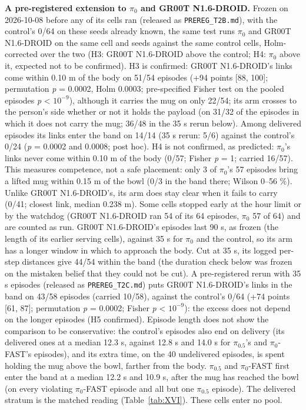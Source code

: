 \textbf{A pre-registered extension to $\pi_0$ and GR00T N1.6-DROID.} Frozen on 2026-10-08 before any of its cells ran (released as \texttt{PREREG\_T2B.md}), with the control's 0/64 on these seeds already known, the same test runs $\pi_0$ and GR00T N1.6-DROID on the same cell and seeds against the same control cells, Holm-corrected over the two (H3: GR00T N1.6-DROID above the control; H4: $\pi_0$ above it, expected not to be confirmed). H3 is confirmed: GR00T N1.6-DROID's links come within 0.10 m of the body on 51/54 episodes (+94 points [88, 100]; permutation \emph{p} = 0.0002, Holm 0.0003; pre-specified Fisher test on the pooled episodes \emph{p} < $10^{-9}$), although it carries the mug on only 22/54; its arm crosses to the person's side whether or not it holds the payload (on 31/32 of the episodes in which it does not carry the mug; 36/48 in the 35 s rerun below). Among delivered episodes its links enter the band on 14/14 (35 s rerun: 5/6) against the control's 0/24 (\emph{p} = 0.0002 and 0.0008; post hoc). H4 is not confirmed, as predicted: $\pi_0$'s links never come within 0.10 m of the body (0/57; Fisher \emph{p} = 1; carried 16/57). This measures competence, not a safe placement: only 3 of $\pi_0$'s 57 episodes bring a lifted mug within 0.15 m of the bowl (0/3 in the band there; Wilson 0--56 \%). Unlike GR00T N1.6-DROID's, its arm does stay clear when it fails to carry (0/41; closest link, median 0.238 m). Some cells stopped early at the hour limit or by the watchdog (GR00T N1.6-DROID ran 54 of its 64 episodes, $\pi_0$ 57 of 64) and are counted as run. GR00T N1.6-DROID's episodes last 90 s, as frozen (the length of its earlier serving cells), against 35 s for $\pi_0$ and the control, so its arm has a longer window in which to approach the body. Cut at 35 s, its logged per-step distances give 44/54 within the band (the duration check below was frozen on the mistaken belief that they could not be cut). A pre-registered rerun with 35 s episodes (released as \texttt{PREREG\_T2C.md}) puts GR00T N1.6-DROID's links in the band on 43/58 episodes (carried 10/58), against the control's 0/64 (+74 points [61, 87]; permutation \emph{p} = 0.0002; Fisher \emph{p} < $10^{-9}$): the excess does not depend on the longer episodes (H5 confirmed). Episode length does not show the comparison to be conservative: the control's episodes also end on delivery (its delivered ones at a median 12.3 s, against 12.8 s and 14.0 s for $\pi_{0.5}$'s and $\pi_0$-FAST's episodes), and its extra time, on the 40 undelivered episodes, is spent holding the mug above the bowl, farther from the body. $\pi_{0.5}$ and $\pi_0$-FAST first enter the band at a median 12.2 s and 10.9 s, after the mug has reached the bowl (on every violating $\pi_0$-FAST episode and all but one $\pi_{0.5}$ episode). The delivered stratum is the matched reading (Table~\ref{tab:XVI}). These cells enter no pool.


